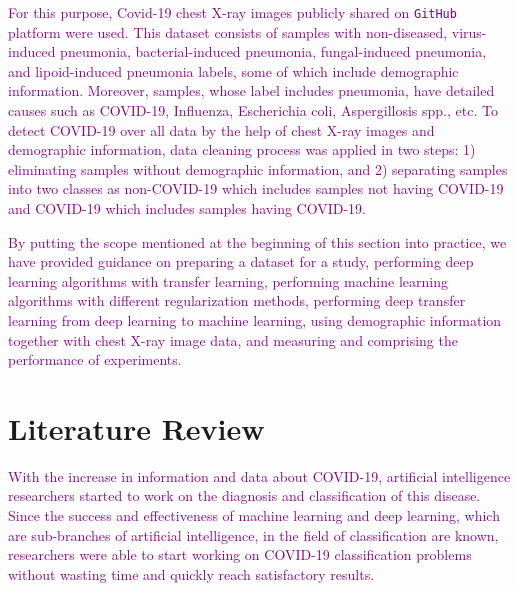 
\textcolor{purple}{For this purpose, Covid-19 chest X-ray images publicly shared on \texttt{GitHub} platform were used. This dataset consists of samples with non-diseased, virus-induced pneumonia, bacterial-induced pneumonia, fungal-induced pneumonia, and lipoid-induced pneumonia labels, some of which include demographic information. Moreover, samples, whose label includes pneumonia, have detailed causes such as COVID-19, Influenza, Escherichia coli, Aspergillosis spp., etc. To detect COVID-19 over all data by the help of chest X-ray images and demographic information, data cleaning process was applied in two steps: 1) eliminating samples without demographic information, and 2) separating samples into two classes as non-COVID-19 which includes samples not having COVID-19 and COVID-19 which includes samples having COVID-19.}

\textcolor{purple}{By putting the scope mentioned at the beginning of this section into practice, we have provided guidance on preparing a dataset for a study, performing deep learning algorithms with transfer learning, performing machine learning algorithms with different regularization methods, performing deep transfer learning from deep learning to machine learning, using demographic information together with chest X-ray image data, and measuring and comprising the performance of experiments.}



\section{Literature Review}\label{literaturereview}

\textcolor{purple}{With the increase in information and data about COVID-19, artificial intelligence researchers started to work on the diagnosis and classification of this disease. Since the success and effectiveness of machine learning and deep learning, which are sub-branches of artificial intelligence, in the field of classification are known, researchers were able to start working on COVID-19 classification problems without wasting time and quickly reach satisfactory results.}


